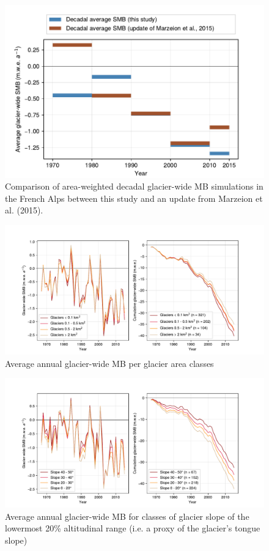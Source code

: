 \begin{figure}[t]
\centering
\includegraphics[width=12cm]{Figures/past/Figure_S7.pdf}
\captionsetup{justification=centering}
\caption{Comparison of area-weighted decadal glacier-wide MB simulations in the French Alps between this study and an update from Marzeion et al. (2015).}
\label{past:figS7}
\end{figure}


\begin{figure}[t] 
\centering
\includegraphics[width=16cm]{Figures/past/Figure_S8.pdf}
\captionsetup{justification=centering}
\caption{Average annual glacier-wide MB per glacier area classes}
\label{past:figS8}
\end{figure}


\begin{figure}[t]
\centering
\includegraphics[width=16cm]{Figures/past/Figure_S9.pdf}
\caption{Average annual glacier-wide MB for classes of glacier slope of the lowermost 20\% altitudinal range (i.e. a proxy of the glacier’s tongue slope)}
\label{past:figS9}
\end{figure}

